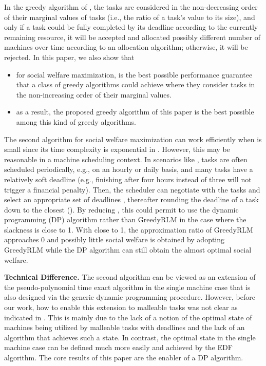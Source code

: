 \documentclass[10pt,journal,compsoc]{IEEEtran}
\begin{document}
In the greedy algorithm of \cite{Jain}, the tasks are considered in the non-decreasing order of their marginal values of tasks (i.e., the ratio of a task's value to its size), and only if a task could be fully completed by its deadline according to the currently remaining resource, it will be accepted and allocated possibly different number of machines over time according to an allocation algorithm; otherwise, it will be rejected. In this paper, we also show that
\begin{itemize}
\item for social welfare maximization,  is the best possible performance guarantee that a class of greedy algorithms could achieve where they consider tasks in the non-increasing order of their marginal values.
\item as a result, the proposed greedy algorithm of this paper is the best possible among this kind of greedy algorithms.
\end{itemize}






The second algorithm for social welfare maximization can work efficiently when  is small since its time complexity is exponential in . However, this may be reasonable in a machine scheduling context. In scenarios like \cite{Bodik}, tasks are often scheduled periodically, e.g., on an hourly or daily basis, and many tasks have a relatively soft deadline (e.g., finishing after four hours instead of three will not trigger a financial penalty). Then, the scheduler can negotiate with the tasks and select an appropriate set of deadlines , thereafter rounding the deadline of a task down to the closest  (). By reducing , this could permit to use the dynamic programming (DP) algorithm rather than GreedyRLM in the case where the slackness  is close to 1. With  close to 1, the approximation ratio of GreedyRLM approaches 0 and possibly little social welfare is obtained by adopting GreedyRLM while the DP algorithm can still obtain the almost optimal social welfare.



\vspace{0.22em}\noindent\textbf{Technical Difference.} The second algorithm can be viewed as an extension of the pseudo-polynomial time exact algorithm in the single machine case \cite{Lawler91} that is also designed via the generic dynamic programming procedure. However, before our work, how to enable this extension to malleable tasks was not clear as indicated in \cite{Jain11a,Jain}. This is mainly due to the lack of a notion of the optimal state of machines being utilized by malleable tasks with deadlines and the lack of an algorithm that achieves such a state. In contrast, the optimal state in the single machine case can be defined much more easily and achieved by the EDF algorithm. The core results of this paper are the enabler of a DP algorithm.
\end{document}
